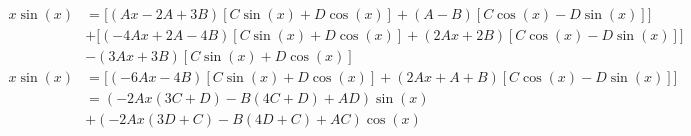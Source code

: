 \documentclass[a4paper, 12pt]{report}
\begin{document}
{\begin{enumerate}[label=\alph*)]
{\begin{align*}
           x\sin(x)&=\big[(Ax-2A+3B)[C\sin(x)+D\cos(x)]+(A-B)[C\cos(x)-D\sin(x)]\big]\\
           &+\big[(-4Ax+2A-4B)[C\sin(x)+D\cos(x)]+(2Ax+2B)[C\cos(x)-D\sin(x)]\big]\\
           &-(3Ax+3B)[C\sin(x)+D\cos(x)]\\
           x\sin(x)&=\big[(-6Ax-4B)[C\sin(x)+D\cos(x)]+(2Ax+A+B)[C\cos(x)-D\sin(x)]\big]\\
                   &=(-2Ax(3C+D)-B(4C+D)+AD)\sin(x)\\
                   &+(-2Ax(3D+C)-B(4D+C)+AC)\cos(x)\\
       \end{align*}
       }
\end{enumerate}
}
\end{document}
